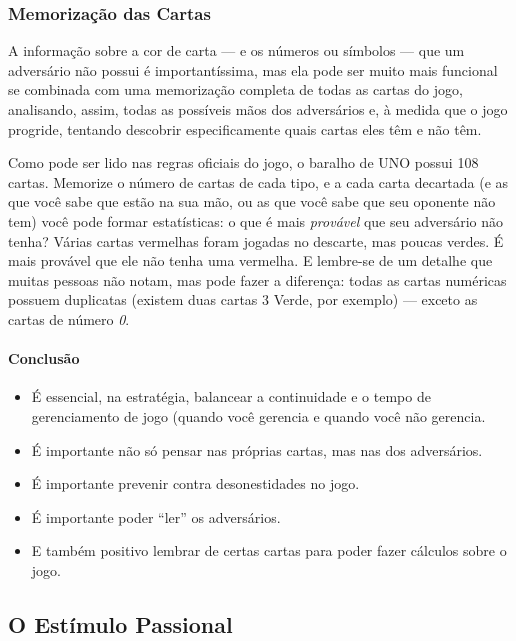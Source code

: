 \subsubsection{Memorização das Cartas}

A informação sobre a cor de carta --- e os números ou símbolos --- que um adversário não possui é importantíssima, mas ela pode ser muito mais funcional se combinada com uma memorização completa de todas as cartas do jogo, analisando, assim, todas as possíveis mãos dos adversários e, à medida que o jogo progride, tentando descobrir especificamente quais cartas eles têm e não têm.

Como pode ser lido nas regras oficiais do jogo, o baralho de UNO possui 108 cartas. Memorize o número de cartas de cada tipo, e a cada carta decartada (e as que você sabe que estão na sua mão, ou as que você sabe que seu oponente não tem) você pode formar estatísticas: o que é mais \textit{provável} que seu adversário não tenha? Várias cartas vermelhas foram jogadas no descarte, mas poucas verdes. É mais provável que ele não tenha uma vermelha. E lembre-se de um detalhe que muitas pessoas não notam, mas pode fazer a diferença: todas as cartas numéricas possuem duplicatas (existem duas cartas 3 Verde, por exemplo) --- exceto as cartas de número \textit{0}.

\paragraph{Conclusão}

\begin{itemize}
\item{É essencial, na estratégia, balancear a continuidade e o tempo de gerenciamento de jogo (quando você gerencia e quando você não gerencia.}
\item{É importante não só pensar nas próprias cartas, mas nas dos adversários.}
\item{É importante prevenir contra desonestidades no jogo.}
\item{É importante poder ``ler'' os adversários.}
\item{E também positivo lembrar de certas cartas para poder fazer cálculos sobre o jogo.}
\end{itemize}

\subsection{O Estímulo Passional}

